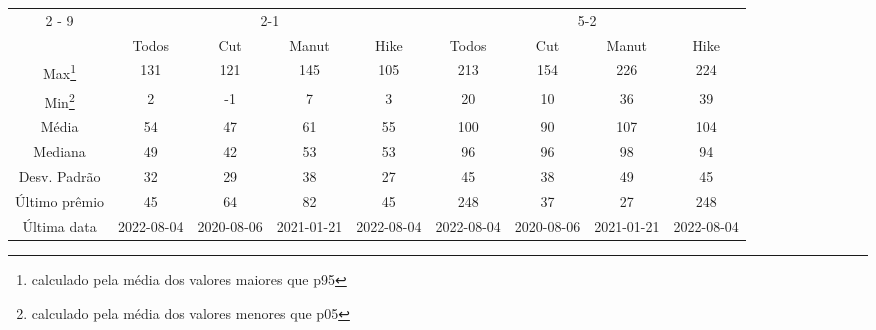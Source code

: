 \documentclass{article}%
\begin{document}
\begin{minipage}{\textwidth}%
\vspace*{0.4in}%
\centering%
\hspace*{-0.3in}%
%
%
\begin{tabular}{c c c c c c c c c }%
\cline{2%
-%
9}%
&\multicolumn{4}{|c|}{2{-}1}&\multicolumn{4}{c|}{5{-}2}\\%
&\multicolumn{1}{|c}{Todos}&\multicolumn{1}{c}{Cut}&\multicolumn{1}{c}{Manut}&\multicolumn{1}{c|}{Hike}&\multicolumn{1}{c}{Todos}&\multicolumn{1}{c}{Cut}&\multicolumn{1}{c}{Manut}&\multicolumn{1}{c|}{Hike}\\%
\hline%
\multicolumn{1}{|c|}{Max\footnote{calculado pela média dos valores maiores que p95}}&\multicolumn{1}{c}{131}&\multicolumn{1}{c}{121}&\multicolumn{1}{c}{145}&\multicolumn{1}{c|}{105}&\multicolumn{1}{c}{213}&\multicolumn{1}{c}{154}&\multicolumn{1}{c}{226}&\multicolumn{1}{c|}{224}\\%
\hline%
\multicolumn{1}{|c|}{Min\footnote{calculado pela média dos valores menores que p05}}&\multicolumn{1}{c}{2}&\multicolumn{1}{c}{{-}1}&\multicolumn{1}{c}{7}&\multicolumn{1}{c|}{3}&\multicolumn{1}{c}{20}&\multicolumn{1}{c}{10}&\multicolumn{1}{c}{36}&\multicolumn{1}{c|}{39}\\%
\hline%
\multicolumn{1}{|c|}{Média}&\multicolumn{1}{c}{54}&\multicolumn{1}{c}{47}&\multicolumn{1}{c}{61}&\multicolumn{1}{c|}{55}&\multicolumn{1}{c}{100}&\multicolumn{1}{c}{90}&\multicolumn{1}{c}{107}&\multicolumn{1}{c|}{104}\\%
\hline%
\multicolumn{1}{|c|}{Mediana}&\multicolumn{1}{c}{49}&\multicolumn{1}{c}{42}&\multicolumn{1}{c}{53}&\multicolumn{1}{c|}{53}&\multicolumn{1}{c}{96}&\multicolumn{1}{c}{96}&\multicolumn{1}{c}{98}&\multicolumn{1}{c|}{94}\\%
\hline%
\multicolumn{1}{|c|}{Desv. Padrão}&\multicolumn{1}{c}{32}&\multicolumn{1}{c}{29}&\multicolumn{1}{c}{38}&\multicolumn{1}{c|}{27}&\multicolumn{1}{c}{45}&\multicolumn{1}{c}{38}&\multicolumn{1}{c}{49}&\multicolumn{1}{c|}{45}\\%
\hline%
\multicolumn{1}{|c|}{Último prêmio}&\multicolumn{1}{c}{45}&\multicolumn{1}{c}{64}&\multicolumn{1}{c}{82}&\multicolumn{1}{c|}{45}&\multicolumn{1}{c}{248}&\multicolumn{1}{c}{37}&\multicolumn{1}{c}{27}&\multicolumn{1}{c|}{248}\\%
\hline%
\multicolumn{1}{|c|}{Última data}&\multicolumn{1}{c}{2022{-}08{-}04}&\multicolumn{1}{c}{2020{-}08{-}06}&\multicolumn{1}{c}{2021{-}01{-}21}&\multicolumn{1}{c|}{2022{-}08{-}04}&\multicolumn{1}{c}{2022{-}08{-}04}&\multicolumn{1}{c}{2020{-}08{-}06}&\multicolumn{1}{c}{2021{-}01{-}21}&\multicolumn{1}{c|}{2022{-}08{-}04}\\%
\hline%
\end{tabular}%



\end{minipage}
\end{document}
